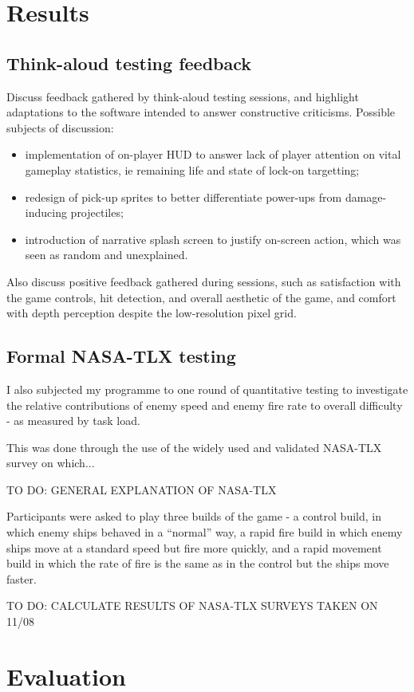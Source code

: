 \documentclass[11pt]{article}
\begin{document}
\section{Results}
\subsection{Think-aloud testing feedback}
Discuss feedback gathered by think-aloud testing sessions, and highlight adaptations
to the software intended to answer constructive criticisms. Possible subjects of
discussion:
\begin{itemize}
   \item implementation of on-player HUD to answer lack of player attention on vital
   gameplay statistics, ie remaining life and state of lock-on targetting;
   \item redesign of pick-up sprites to better differentiate power-ups from
   damage-inducing projectiles;
   \item introduction of narrative splash screen to justify on-screen action, which
   was seen as random and unexplained.
\end{itemize}
Also discuss positive feedback gathered during sessions, such as satisfaction
with the game controls, hit detection, and overall aesthetic of the game, and comfort
with depth perception despite the low-resolution pixel grid.
\subsection{Formal NASA-TLX testing}\label{tlx}
I also subjected my programme to one round of quantitative testing to investigate the
relative contributions of enemy speed and enemy fire rate to overall difficulty - as
measured by task load.

This was done through the use of the widely used and validated NASA-TLX survey on which...

TO DO: GENERAL EXPLANATION OF NASA-TLX

Participants were asked to play three builds of the game - a control build, in which enemy
ships behaved in a ``normal'' way, a rapid fire build in which enemy ships move at a standard
speed but fire more quickly, and a rapid movement build in which the rate of fire is the same
as in the control but the ships move faster.

TO DO: CALCULATE RESULTS OF NASA-TLX SURVEYS TAKEN ON 11/08


\section{Evaluation}
\end{document}
